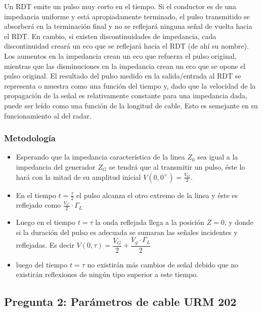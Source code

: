\documentclass[11pt,onecolumn]{article}
\begin{document}
Un RDT emite un pulso muy corto en el tiempo. Si el conductor es de una impedancia uniforme
y está apropiadamente terminado, el pulso transmitido se absorberá en la terminación final
y no se reflejará ninguna señal de vuelta hacia el RDT. En cambio, si existen
discontinuidades de impedancia, cada discontinuidad creará un eco que se reflejará hacia el
RDT (de ahí su nombre). Los aumentos en la impedancia crean un eco que refuerza el pulso
original, mientras que las disminuciones en la impedancia crean un eco que se opone el
pulso original. El resultado del pulso medido en la salida/entrada al RDT se representa o
muestra como una función del tiempo y, dado que la velocidad de la propagación de la señal
es relativamente constante para una impedancia dada, puede ser leído como una función de la
longitud de cable. Esto es semejante en su funcionamiento al del radar.

\subsubsection*{Metodología}

\begin{itemize}
\item Esperando que la impedancia característica de la linea $Z_{0}$ sea igual a la impedancia del generador $Z_{G}$ se tendrá que al transmitir un pulso, éste lo hará con la mitad de su amplitud inicial $ V(0,0^{+}) = \frac{V_{G}}{2}$. 

\item En el tiempo $t = \frac{\tau}{2}$ el pulso alcanza el otro extremo de la linea y éste es reflejado como $\frac{V_{G}}{2} \cdot \Gamma_{L}$


\item Luego en el tiempo $t = \tau$ la onda reflejada llega a la posición $Z = 0$, y donde si la duración del pulso es adecuada se sumaran las señales incidentes y reflejadas. Es decir $V(0,\tau) = \dfrac{V_{G}}{2} + \dfrac{V_{g}\cdot \Gamma_{L}}{2}$ 

\item luego del tiempo $t = \tau$ no existirán más cambios de señal debido que no existirán reflexiones de ningún tipo superior a este tiempo.

\end{itemize}

\newpage

\subsection*{Pregunta 2: Parámetros de cable URM 202}
\end{document}
